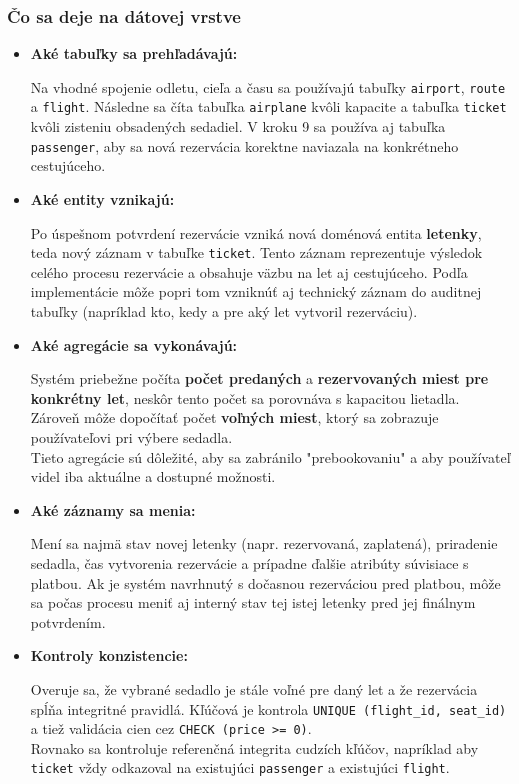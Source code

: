 \documentclass[11pt, a4paper]{article}
\begin{document}
\subsubsection*{Čo sa deje na dátovej vrstve}
\begin{itemize}
    \item \textbf{Aké tabuľky sa prehľadávajú:} 
    
    Na vhodné spojenie odletu, cieľa a času sa používajú tabuľky \texttt{airport}, \texttt{route} a \texttt{flight}. Následne sa číta tabuľka \texttt{airplane} kvôli kapacite a tabuľka \texttt{ticket} kvôli zisteniu obsadených sedadiel. V kroku 9 sa používa aj tabuľka \texttt{passenger}, aby sa nová rezervácia korektne naviazala na konkrétneho cestujúceho.
    
    \item \textbf{Aké entity vznikajú:} 
    
    Po úspešnom potvrdení rezervácie vzniká nová doménová entita \textbf{letenky}, teda nový záznam v tabuľke \texttt{ticket}. Tento záznam reprezentuje výsledok celého procesu rezervácie a obsahuje väzbu na let aj cestujúceho. Podľa implementácie môže popri tom vzniknúť aj technický záznam do auditnej tabuľky (napríklad kto, kedy a pre aký let vytvoril rezerváciu).
    
    
    \item \textbf{Aké agregácie sa vykonávajú:} 
    
    Systém priebežne počíta \textbf{počet predaných} a \textbf{rezervovaných miest pre konkrétny let}, neskôr tento počet sa porovnáva s kapacitou lietadla. Zároveň môže dopočítať počet \textbf{voľných miest}, ktorý sa zobrazuje používateľovi pri výbere sedadla. \\
    Tieto agregácie sú dôležité, aby sa zabránilo "prebookovaniu" a aby používateľ videl iba aktuálne a dostupné možnosti.
    
    \item \textbf{Aké záznamy sa menia:} 
    
    Mení sa najmä stav novej letenky (napr. rezervovaná, zaplatená), priradenie sedadla, čas vytvorenia rezervácie a prípadne ďalšie atribúty súvisiace s platbou. Ak je systém navrhnutý s dočasnou rezerváciou pred platbou, môže sa počas procesu meniť aj interný stav tej istej letenky pred jej finálnym potvrdením.

    \item \textbf{Kontroly konzistencie:} 
    
    Overuje sa, že vybrané sedadlo je stále voľné pre daný let a že rezervácia spĺňa integritné pravidlá. Kľúčová je kontrola \texttt{UNIQUE (flight\_id, seat\_id)} a tiež validácia cien cez \texttt{CHECK (price >= 0)}. \\
    Rovnako sa kontroluje referenčná integrita cudzích kľúčov, napríklad aby \texttt{ticket} vždy odkazoval na existujúci \texttt{passenger} a existujúci \texttt{flight}.
\end{itemize}
\end{document}
